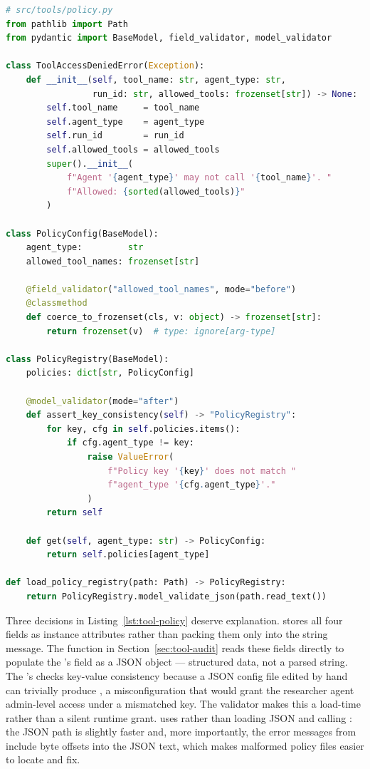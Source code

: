 \begin{lstlisting}[language=Python,
  caption={PolicyConfig, PolicyRegistry, and ToolAccessDeniedError},
  label={lst:tool-policy}]
# src/tools/policy.py
from pathlib import Path
from pydantic import BaseModel, field_validator, model_validator

class ToolAccessDeniedError(Exception):
    def __init__(self, tool_name: str, agent_type: str,
                 run_id: str, allowed_tools: frozenset[str]) -> None:
        self.tool_name     = tool_name
        self.agent_type    = agent_type
        self.run_id        = run_id
        self.allowed_tools = allowed_tools
        super().__init__(
            f"Agent '{agent_type}' may not call '{tool_name}'. "
            f"Allowed: {sorted(allowed_tools)}"
        )

class PolicyConfig(BaseModel):
    agent_type:         str
    allowed_tool_names: frozenset[str]

    @field_validator("allowed_tool_names", mode="before")
    @classmethod
    def coerce_to_frozenset(cls, v: object) -> frozenset[str]:
        return frozenset(v)  # type: ignore[arg-type]

class PolicyRegistry(BaseModel):
    policies: dict[str, PolicyConfig]

    @model_validator(mode="after")
    def assert_key_consistency(self) -> "PolicyRegistry":
        for key, cfg in self.policies.items():
            if cfg.agent_type != key:
                raise ValueError(
                    f"Policy key '{key}' does not match "
                    f"agent_type '{cfg.agent_type}'."
                )
        return self

    def get(self, agent_type: str) -> PolicyConfig:
        return self.policies[agent_type]

def load_policy_registry(path: Path) -> PolicyRegistry:
    return PolicyRegistry.model_validate_json(path.read_text())
\end{lstlisting}

Three decisions in Listing~\ref{lst:tool-policy} deserve explanation.
 stores all four fields as instance attributes
rather than packing them only into the string message. The
 function in Section~\ref{sec:tool-audit}
reads these fields directly to populate the 's
 field as a JSON object --- structured data, not a parsed
string. The 's  checks
key-value consistency because a JSON config file edited by hand can
trivially produce , a misconfiguration that would grant the researcher agent admin-level
access under a mismatched key. The validator makes this a load-time
 rather than a silent runtime grant.
 uses  rather
than loading JSON and calling : the JSON path
is slightly faster and, more importantly, the error messages from
 include byte offsets into the JSON text, which
makes malformed policy files easier to locate and fix.

